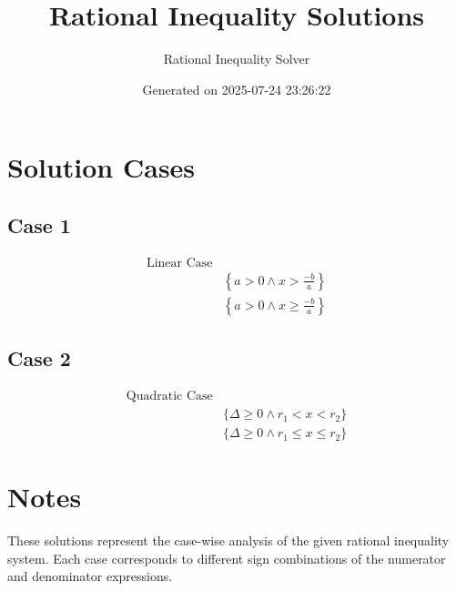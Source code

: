 \documentclass{article}
\title{Rational Inequality Solutions}
\author{Rational Inequality Solver}
\date{Generated on 2025-07-24 23:26:22}
\begin{document}
\maketitle

\section{Solution Cases}

\subsection{Case 1}

\begin{align}
\text{Linear Case} \\
& \left\{a > 0 \wedge x > \frac{-b}{a}\right\} \\
& \left\{a > 0 \wedge x \ge \frac{-b}{a}\right\}
\end{align}

\subsection{Case 2}

\begin{align}
\text{Quadratic Case} \\
& \{\Delta \ge 0 \wedge r_1 < x < r_2\} \\
& \{\Delta \ge 0 \wedge r_1 \le x \le r_2\}
\end{align}


\section{Notes}

These solutions represent the case-wise analysis of the given rational inequality system. Each case corresponds to different sign combinations of the numerator and denominator expressions.
\end{document}

